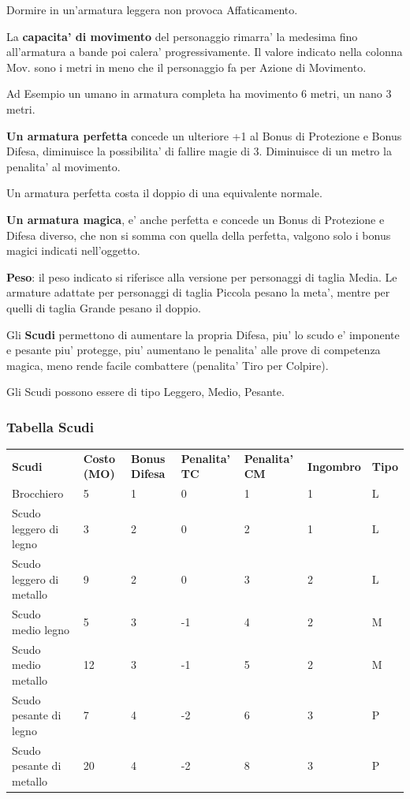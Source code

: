 \documentclass[a4paper,11pt,twoside,openany]{book}
\begin{document}
{Dormire in un'armatura leggera non provoca Affaticamento.

La \textbf{capacita' di movimento} del personaggio rimarra' la medesima fino all'armatura a bande poi calera' progressivamente. Il valore indicato nella colonna Mov. sono i metri in meno che il personaggio fa per Azione di Movimento.

Ad Esempio un umano in armatura completa ha movimento 6 metri, un nano 3 metri. 

\textbf{Un armatura perfetta} concede un ulteriore +1 al Bonus di Protezione e Bonus Difesa, diminuisce la possibilita' di fallire magie di 3. Diminuisce di un metro la penalita' al movimento. 

Un armatura perfetta costa il doppio di una equivalente normale.

\textbf{Un armatura magica}, e' anche perfetta e concede un Bonus di Protezione e Difesa diverso, che non si somma con quella della perfetta, valgono solo i bonus magici indicati nell'oggetto.

\textbf{Peso}: il peso indicato si riferisce alla versione per personaggi di taglia Media. Le armature adattate per personaggi di taglia Piccola pesano la meta', mentre per quelli di taglia Grande pesano il doppio.

\pagebreak

Gli \textbf{Scudi} permettono di aumentare la propria Difesa, piu' lo scudo e' imponente e pesante piu' protegge, piu' aumentano le penalita' alle prove di competenza magica, meno rende facile combattere (penalita' Tiro per Colpire).

Gli Scudi possono essere di tipo Leggero, Medio, Pesante.

\subsubsection{Tabella Scudi}

\label{tabella-scudi}
\medskip
\begin{tabular}{lllllll}
\toprule
\textbf{Scudi} & \textbf{Costo (MO)} & \textbf{Bonus Difesa} & \textbf{Penalita' TC} & \textbf{Penalita' CM} & \textbf{Ingombro} & \textbf{Tipo}\tabularnewline
Brocchiero & 5 & 1 & 0 & 1 & 1 &L\tabularnewline
Scudo leggero di legno & 3 & 2 & 0 & 2 & 1 &L\tabularnewline
Scudo leggero di metallo & 9 & 2 & 0 & 3 & 2 &L\tabularnewline
Scudo medio legno & 5 & 3 & -1 & 4 & 2 &M\tabularnewline
Scudo medio metallo & 12 & 3 & -1 & 5 & 2 &M\tabularnewline
Scudo pesante di legno & 7 & 4 & -2 & 6 & 3 &P\tabularnewline
Scudo pesante di metallo & 20 & 4 & -2 & 8 & 3 & P\tabularnewline
\end{tabular}

}
\end{document}
